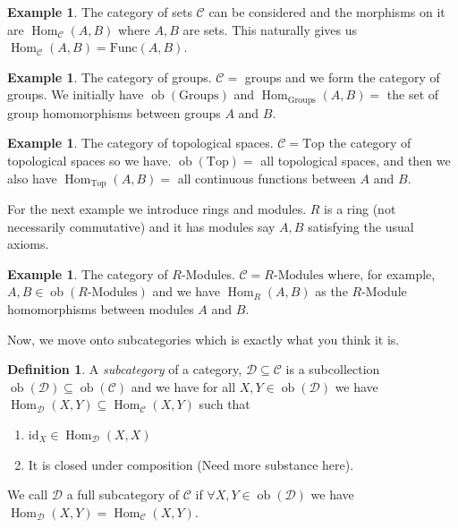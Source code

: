 \documentclass[11pt,a4paper]{article}
\DeclareMathOperator{\Hom}{Hom}
\newcommand{\Cat}{\mathcal{C}}
\newcommand{\CatD}{\mathcal{D}}
\DeclareMathOperator{\ob}{ob}
\theoremstyle{plain}
\theoremstyle{definition}
\newtheorem{definition}[theorem]{Definition}
\newtheorem{example}[theorem]{Example}
\theoremstyle{remark}
\begin{document}
\begin{example}
    The category of sets $\Cat$ can be considered and the morphisms on it are $\Hom_\Cat(A,B)$ where $A, B$ are sets. This naturally gives us $\Hom_\Cat(A,B) = \text{Func}(A,B)$. 
\end{example}

\begin{example}
    The category of groups. $\Cat = $ groups and we form the category of groups. We initially have $\ob(\text{Groups})$ and $\Hom_{\text{Groups}}(A,B) =$ the set of group homomorphisms between groups $A$ and $B$.    
\end{example}

\begin{example}
    The category of topological spaces. $\Cat = \text{Top}$ the category of topological spaces so we have. $\ob(\text{Top}) =$ all topological spaces, and then we also have $\Hom_{\text{Top}}(A,B) =$ all continuous functions between $A$ and $B$.
\end{example}

\noindent
For the next example we introduce rings and modules. $R$ is a ring (not necessarily commutative) and it has modules say $A,B$ satisfying the usual axioms. 

\begin{example}
    The category of $R$-Modules. $\Cat = R\text{-Modules}$ where, for example, $A,B \in \ob(R\text{-Modules})$ and we have $\Hom_{R}(A,B)$ as the $R$-Module homomorphisms between modules $A$ and $B$.
\end{example}

\noindent
Now, we move onto subcategories which is exactly what you think it is. 

\begin{definition}
    A \emph{subcategory} of a category, $\CatD \subseteq \Cat$ is a subcollection $\ob(\CatD) \subseteq \ob(\Cat)$ and we have for all $X, Y \in \ob(\CatD)$ we have $\Hom_\CatD(X,Y) \subseteq \Hom_\Cat(X,Y)$ such that \begin{enumerate}
        \item $\text{id}_X \in \Hom_\CatD(X,X)$
        \item It is closed under composition (Need more substance here).
    \end{enumerate} 
\end{definition}
\noindent
We call $\CatD$ a full subcategory of $\Cat$ if $\forall X,Y \in \ob(\CatD)$ we have $\Hom_\CatD(X,Y) = \Hom_\Cat(X,Y)$. 
\end{document}
